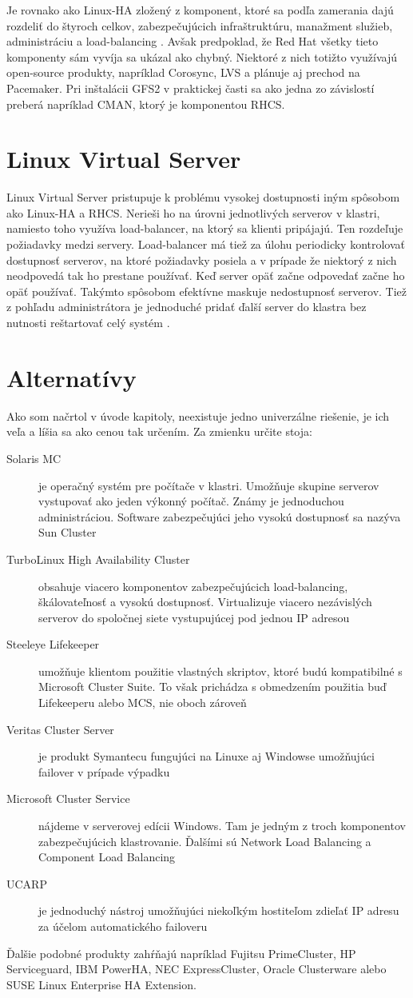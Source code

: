 Je rovnako ako Linux-HA zložený z komponent, ktoré sa podľa zamerania dajú rozdeliť do štyroch celkov, zabezpečujúcich infraštruktúru, manažment služieb, administráciu a load-balancing \cite{web:rhcs-dokumentacia}. Avšak predpoklad, že Red Hat všetky tieto komponenty sám vyvíja sa ukázal ako chybný. Niektoré z nich totižto využívajú open-source produkty, napríklad Corosync, LVS a plánuje aj prechod na Pacemaker. Pri inštalácii GFS2 v praktickej časti sa ako jedna zo závislostí preberá napríklad CMAN, ktorý je komponentou RHCS.

\section{Linux Virtual Server}
Linux Virtual Server pristupuje k problému vysokej dostupnosti iným spôsobom ako Linux-HA a RHCS. Nerieši ho na úrovni jednotlivých serverov v klastri, namiesto toho využíva load-balancer, na ktorý sa klienti pripájajú. Ten rozdeľuje požiadavky medzi servery. Load-balancer má tiež za úlohu periodicky kontrolovať dostupnosť serverov, na ktoré požiadavky posiela a v prípade že niektorý z nich neodpovedá tak ho prestane používať. Keď server opäť začne odpovedať začne ho opäť používať. Takýmto spôsobom efektívne maskuje nedostupnosť serverov. Tiež z pohľadu administrátora je jednoduché pridať ďalší server do klastra bez nutnosti reštartovať celý systém \cite{web:linux-virtual-server}.

\section{Alternatívy}
Ako som načrtol v úvode kapitoly, neexistuje jedno univerzálne riešenie, je ich veľa a líšia sa ako cenou tak určením. Za zmienku určite stoja:

\begin{description}
	\item[Solaris MC] je operačný systém pre počítače v klastri. Umožňuje skupine serverov vystupovať ako jeden výkonný počítač. Známy je jednoduchou administráciou. Software zabezpečujúci jeho vysokú dostupnosť sa nazýva Sun Cluster
	\item[TurboLinux High Availability Cluster] obsahuje viacero komponentov zabezpečujúcich load-balancing, škálovateľnosť a vysokú dostupnosť. Virtualizuje viacero nezávislých serverov do spoločnej siete vystupujúcej pod jednou IP adresou
	\item[Steeleye Lifekeeper] umožňuje klientom použitie vlastných skriptov, ktoré budú kompatibilné s Microsoft Cluster Suite. To však prichádza s obmedzením použitia buď Lifekeeperu alebo MCS, nie oboch zároveň
	\item[Veritas Cluster Server] je produkt Symantecu fungujúci na Linuxe aj Windowse umožňujúci failover v prípade výpadku
	\item[Microsoft Cluster Service] nájdeme v serverovej edícii Windows. Tam je jedným z troch komponentov zabezpečujúcich klastrovanie. Ďalšími sú Network Load Balancing a Component Load Balancing
	\item[UCARP] je jednoduchý nástroj umožňujúci niekoľkým hostiteľom zdieľať IP adresu za účelom automatického failoveru
\end{description}

Ďalšie podobné produkty zahŕňajú napríklad Fujitsu PrimeCluster, HP Serviceguard, IBM PowerHA, NEC ExpressCluster, Oracle Clusterware alebo SUSE Linux Enterprise HA Extension.

\emptydoublepage